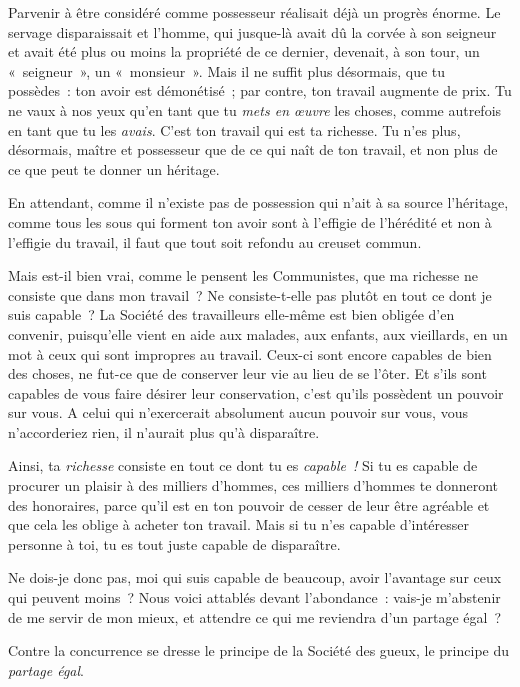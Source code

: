 \documentclass[french,twoside]{book} %
\begin{document}
Parvenir à être considéré comme possesseur réalisait déjà un progrès énorme. Le servage disparaissait et l’homme, qui jusque-là avait dû la corvée à son seigneur et avait été plus ou moins la propriété de ce dernier, devenait, à son tour, un « seigneur », un « monsieur ». Mais il ne suffit plus désormais, que tu possèdes : ton avoir est démonétisé ; par contre, ton travail augmente de prix. Tu ne vaux à nos yeux qu’en tant que tu \emph{mets en œuvre} les choses, comme autrefois en tant que tu les \emph{avais}. C’est ton travail qui est ta richesse. Tu n’es plus, désormais, maître et possesseur que de ce qui naît de ton travail, et non plus de ce que peut te donner un héritage.\par
En attendant, comme il n’existe pas de possession  qui n’ait à sa source l’héritage, comme tous les sous qui forment ton avoir sont à l’effigie de l’hérédité et non à l’effigie du travail, il faut que tout soit refondu au creuset commun.\par
Mais est-il bien vrai, comme le pensent les Communistes, que ma richesse ne consiste que dans mon travail ? Ne consiste-t-elle pas plutôt en tout ce dont je suis capable ? La Société des travailleurs elle-même est bien obligée d’en convenir, puisqu’elle vient en aide aux malades, aux enfants, aux vieillards, en un mot à ceux qui sont impropres au travail. Ceux-ci sont encore capables de bien des choses, ne fut-ce que de conserver leur vie au lieu de se l’ôter. Et s’ils sont capables de vous faire désirer leur conservation, c’est qu’ils possèdent un pouvoir sur vous. A celui qui n’exercerait absolument aucun pouvoir sur vous, vous n’accorderiez rien, il n’aurait plus qu’à disparaître.\par
Ainsi, ta \emph{richesse} consiste en tout ce dont tu es \emph{capable !} Si tu es capable de procurer un plaisir à des milliers d’hommes, ces milliers d’hommes te donneront des honoraires, parce qu’il est en ton pouvoir de cesser de leur être agréable et que cela les oblige à acheter ton travail. Mais si tu n’es capable d’intéresser personne à toi, tu es tout juste capable de disparaître.\par
Ne dois-je donc pas, moi qui suis capable de beaucoup, avoir l’avantage sur ceux qui peuvent moins ? Nous voici attablés devant l’abondance : vais-je m’abstenir de me servir de mon mieux, et attendre ce qui me reviendra d’un partage égal ?\par
Contre la concurrence se dresse le principe de la Société des gueux, le principe du \emph{partage égal}.\par
\end{document}
